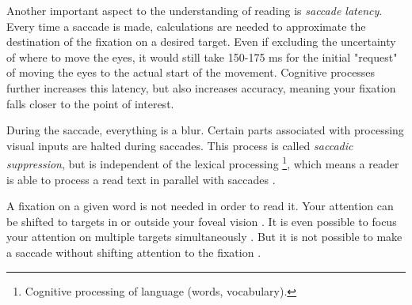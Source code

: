 Another important aspect to the understanding of reading is \textit{saccade latency}. Every time a saccade is made, calculations are needed to approximate the destination of the fixation on a desired target. Even if excluding the uncertainty of where to move the eyes, it would still take 150-175 ms for the initial "request" of moving the eyes to the actual start of the movement. Cognitive processes further increases this latency, but also increases accuracy, meaning your fixation falls closer to the point of interest.


During the saccade, everything is a blur. Certain parts associated with processing visual inputs are halted during saccades. This process is called \textit{saccadic suppression}, but is independent of the lexical processing \footnote{Cognitive processing of language (words, vocabulary).}, which means a reader is able to process a read text in parallel with saccades \cite{eyeMovement}.

A fixation on a given word is not needed in order to read it. Your attention can be shifted to targets in or outside your foveal vision \cite{eyeMovement}. It is even possible to focus your attention on multiple targets simultaneously \cite{simAttention}. But it is not possible to make a saccade without shifting attention to the fixation \cite{eyeMovement}.